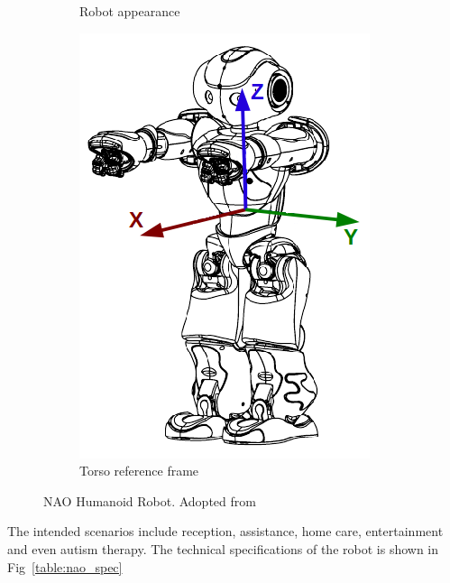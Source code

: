 \begin{figure}[H]
\begin{subfigure}[b]{0.25\textwidth}
\caption{Robot appearance}
\label{fig:naojoint}
\end{subfigure}
\begin{subfigure}[b]{0.25\textwidth}
\includegraphics[width=\textwidth]{assets/hardware_inertialunit1.png}
\caption{Torso reference frame}
\label{fig:naoreference}
\end{subfigure}
\caption[NAO Humanoid Robot]{NAO Humanoid Robot. {Adopted from \cite{NaoRobot}}}
\label{fig:naorobot}
\end{figure}%
The intended scenarios include reception, assistance, home care, entertainment and even autism therapy. The technical specifications of the robot is shown in Fig~\ref{table:nao_spec}
